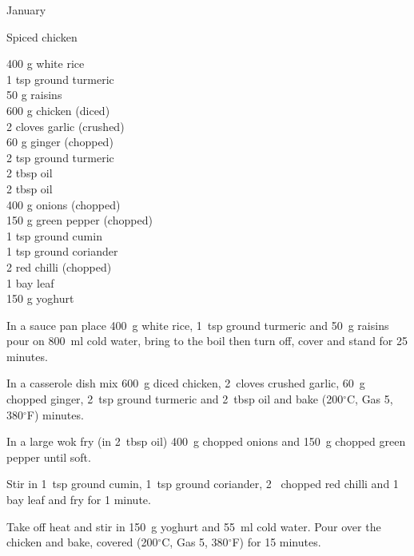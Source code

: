 \begin{menu}{January}
    \begin{recipe}{2}{Spiced chicken}%
		\begin{ingredients}
		400 g white rice  \\
	1 tsp ground turmeric  \\
	50 g raisins  \\
	600 g chicken (diced) \\
	2 cloves garlic (crushed) \\
	60 g ginger (chopped) \\
	2 tsp ground turmeric  \\
	2 tbsp oil  \\
	2 tbsp oil  \\
	400 g onions (chopped) \\
	150 g green pepper (chopped) \\
	1 tsp ground cumin  \\
	1 tsp ground coriander  \\
	2  red chilli (chopped) \\
	1  bay leaf  \\
	150 g yoghurt  \\
	
		\end{ingredients}
	
    \begin{instructions}
    \item 
      In a
      sauce pan
      place
      400~g  white rice,
      1~tsp  ground turmeric
      and
      50~g  raisins
      pour on
      800~ml  cold water,
      bring to the boil then turn off, cover and stand for 25 minutes.
    \item 
        In a casserole dish mix
        600~g diced chicken,
        2~cloves crushed garlic,
        60~g chopped ginger,
        2~tsp  ground turmeric and
        2~tbsp  oil
        and
        bake (200$^{\circ}$C, Gas 5, 380$^{\circ}$F) minutes.
      \item 
        In a large wok fry
        (in 2~tbsp  oil)
        400~g chopped onions
        and
        150~g chopped green pepper
        until soft.
      \item 
        Stir in
        1~tsp  ground cumin,
        1~tsp  ground coriander,
        2~ chopped red chilli
        and
        1~  bay leaf
        and fry for 1 minute.
      \item 
        Take off heat
        and
        stir in
        150~g  yoghurt
        and
        55~ml  cold water.
        Pour over the chicken
        and bake,
        covered (200$^{\circ}$C, Gas 5, 380$^{\circ}$F) for 15 minutes.
      

\end{instructions}
\end{recipe}
\end{menu}
